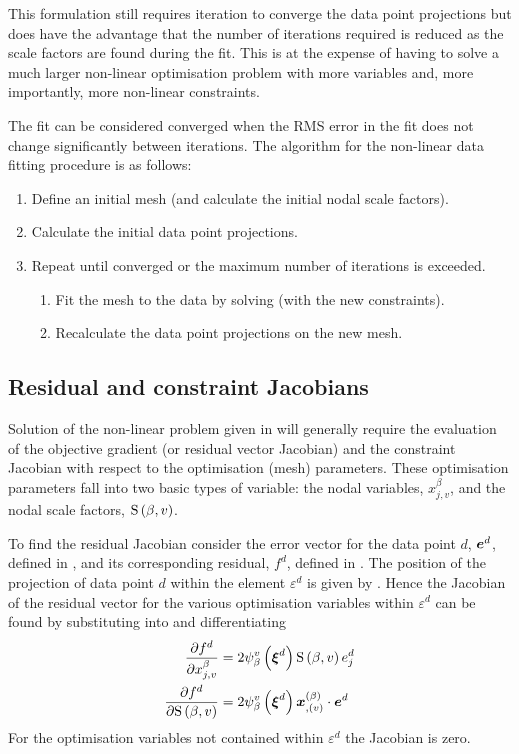 This formulation still requires iteration to converge the data point
projections but does have the advantage that the number of iterations required
is reduced as the scale factors are found during the fit. This is at the
expense of having to solve a much larger non-linear optimisation problem with
more variables and, more importantly, more non-linear constraints.

The fit can be considered converged when the RMS error in the fit does not
change significantly between iterations.  The algorithm for the non-linear data
fitting procedure is as follows:
\begin{enumerate}
\item Define an initial mesh (and calculate the initial nodal scale factors).
\item Calculate the initial data point projections.
\item Repeat until converged or the maximum number of iterations is exceeded.
  \begin{enumerate}
  \item Fit the mesh to the data by solving  (with
    the new constraints).
  \item Recalculate the data point projections on the new mesh.
  \end{enumerate}
\end{enumerate}

\subsection{Residual and constraint Jacobians}
\label{sec:resandcontjacs}

Solution of the non-linear problem given in  will
generally require the evaluation of the objective gradient (or residual vector
Jacobian) and the constraint Jacobian with respect to the optimisation (mesh)
parameters. These optimisation parameters fall into two basic types of
variable: the nodal variables, $x^{\beta}_{j,v}$, and the nodal scale
factors, $   \mathrm{S} \left( \beta,v \right)  $.

To find the residual Jacobian consider the error vector for the data point
$d$, $\boldsymbol{e}^{d}$, defined in , and its
corresponding residual, $f^{d}$, defined in . The
position of the projection of data point $d$ within the element
$\varepsilon^{d}$ is given by . Hence the
Jacobian of the residual vector for the various optimisation variables within
$\varepsilon^{d}$ can be found by substituting
 into
 and differentiating \ie
\begin{align}
  \delby{f^{d}}{x^{\beta}_{j,v}}&=2\gbfn{\beta}{v}{
    \vectr{\xi}^{d}}\gsf{\beta}{v}e^{d}_{j} 
  \label{eqn:dataresjacnodevars} \\
  \delby{f^{d}}{\gsf{\beta}{v}}&=2\gbfn{\beta}{v}{\vectr{\xi}^{d}}
  \dotprod{\vectr{x}^{\pbrac{\beta}}_{,\pbrac{v}}}{\vectr{e}^{d}}
  \label{eqn:dataresjacsfvars}
\end{align}
For the optimisation variables not contained within $\varepsilon^{d}$ the
Jacobian is zero.
  
